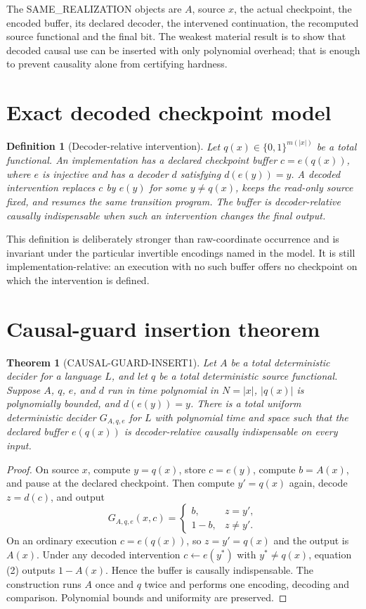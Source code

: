 \documentclass[11pt]{article}
\newtheorem{theorem}{Theorem}
\newtheorem{definition}{Definition}
\begin{document}
The SAME\_REALIZATION objects are $A$, source $x$, the actual checkpoint,
the encoded buffer, its declared decoder, the intervened continuation, the
recomputed source functional and the final bit.  The weakest material result
is to show that decoded causal use can be inserted with only polynomial
overhead; that is enough to prevent causality alone from certifying hardness.

\section{Exact decoded checkpoint model}
\begin{definition}[Decoder-relative intervention]
Let $q(x)\in\{0,1\}^{m(|x|)}$ be a total functional.  An implementation has a
declared checkpoint buffer $c=e(q(x))$, where $e$ is injective and has a
decoder $d$ satisfying $d(e(y))=y$.  A decoded intervention replaces $c$ by
$e(y)$ for some $y\ne q(x)$, keeps the read-only source fixed, and resumes the
same transition program.  The buffer is decoder-relative causally
indispensable when such an intervention changes the final output.
\end{definition}

This definition is deliberately stronger than raw-coordinate occurrence and
is invariant under the particular invertible encodings named in the model.
It is still implementation-relative: an execution with no such buffer offers
no checkpoint on which the intervention is defined.

\section{Causal-guard insertion theorem}
\begin{theorem}[CAUSAL-GUARD-INSERT1]
Let $A$ be a total deterministic decider for a language $L$, and let $q$ be a
total deterministic source functional.  Suppose $A$, $q$, $e$, and $d$ run in
time polynomial in $N=|x|$, $|q(x)|$ is polynomially bounded, and
$d(e(y))=y$.  There is a total uniform deterministic decider
$G_{A,q,e}$ for $L$ with polynomial time and space such that the declared
buffer $e(q(x))$ is decoder-relative causally indispensable on every input.
\end{theorem}
\begin{proof}
On source $x$, compute $y=q(x)$, store $c=e(y)$, compute $b=A(x)$, and pause
at the declared checkpoint.  Then compute $y'=q(x)$ again, decode
$z=d(c)$, and output
\[
 G_{A,q,e}(x,c)=
 \begin{cases}
 b,&z=y',\\
 1-b,&z\ne y'.
 \end{cases}                                               \tag{2}
\]
On an ordinary execution $c=e(q(x))$, so $z=y'=q(x)$ and the output is
$A(x)$.  Under any decoded intervention $c\leftarrow e(y^*)$ with
$y^*\ne q(x)$, equation (2) outputs $1-A(x)$.  Hence the buffer is causally
indispensable.  The construction runs $A$ once and $q$ twice and performs
one encoding, decoding and comparison.  Polynomial bounds and uniformity are
preserved.
\end{proof}
\end{document}
